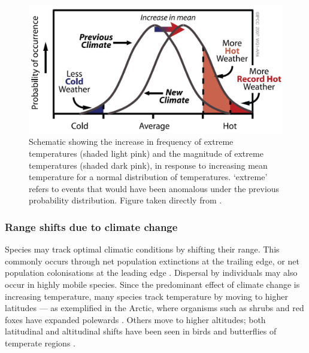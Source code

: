 \documentclass[12pt,a4paper,]{report}
\theoremstyle{definition}
\theoremstyle{definition}
\theoremstyle{definition}
\theoremstyle{remark}
\begin{document}
\begin{figure}
\centering
\includegraphics{figs/Fig1.1.jpg}
\caption{\label{fig:fig-1-1}Schematic showing the increase in frequency of extreme
temperatures (shaded light pink) and the magnitude of extreme
temperatures (shaded dark pink), in response to increasing mean
temperature for a normal distribution of temperatures. `extreme' refers
to events that would have been anomalous under the previous probability
distribution. Figure taken directly from \citet{ipcc_climate2007}.}
\end{figure}

\subsubsection{Range shifts due to climate
change}\label{range-shifts-due-to-climate-change}

Species may track optimal climatic conditions by shifting their range.
This commonly occurs through net population extinctions at the trailing
edge, or net population colonisations at the leading edge
\citep{parmesan_poleward1999}. Dispersal by individuals may also occur
in highly mobile species. Since the predominant effect of climate change
is increasing temperature, many species track temperature by moving to
higher latitudes --- as exemplified in the Arctic, where organisms such
as shrubs and red foxes have expanded polewards
\citep{hersteinsson_interspecific1992, sturm_climate2001}. Others move
to higher altitudes; both latitudinal and altitudinal shifts have been
seen in birds and butterflies of temperate regions
\citep{hill_responses2002, parmesan_poleward1999, thomas_birds1999}.
\end{document}
